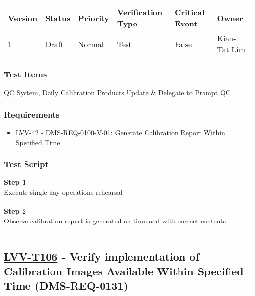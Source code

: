 \begin{longtable}[]{@{}llllll@{}}
\toprule
Version & Status & Priority & Verification Type & Critical Event &
Owner\tabularnewline
\midrule
\endhead
1 & Draft & Normal & Test & False & Kian-Tat Lim\tabularnewline
\bottomrule
\end{longtable}

\hypertarget{test-items-5}{%
\subsubsection{Test Items}\label{test-items-5}}

QC System, Daily Calibration Products Update \& Delegate to Prompt QC

\hypertarget{requirements-5}{%
\subsubsection{Requirements}\label{requirements-5}}

\begin{itemize}
\tightlist
\item
  \href{https://jira.lsstcorp.org/browse/LVV-42}{LVV-42} -
  DMS-REQ-0100-V-01: Generate Calibration Report Within Specified Time
\end{itemize}

\hypertarget{test-script-5}{%
\subsubsection{Test Script}\label{test-script-5}}

\textbf{Step 1}\\
Execute single-day operations rehearsal\\
~\\
\textbf{Step 2}\\
Observe calibration report is generated on time and with correct
contents\\
~\\

\hypertarget{lvv-t106---verify-implementation-of-calibration-images-available-within-specified-time-dms-req-0131}{%
\subsection{\texorpdfstring{\href{https://jira.lsstcorp.org/secure/Tests.jspa\#/testCase/LVV-T106}{LVV-T106}
- Verify implementation of Calibration Images Available Within Specified
Time
(DMS-REQ-0131)}{LVV-T106 - Verify implementation of Calibration Images Available Within Specified Time (DMS-REQ-0131)}}\label{lvv-t106---verify-implementation-of-calibration-images-available-within-specified-time-dms-req-0131}}


